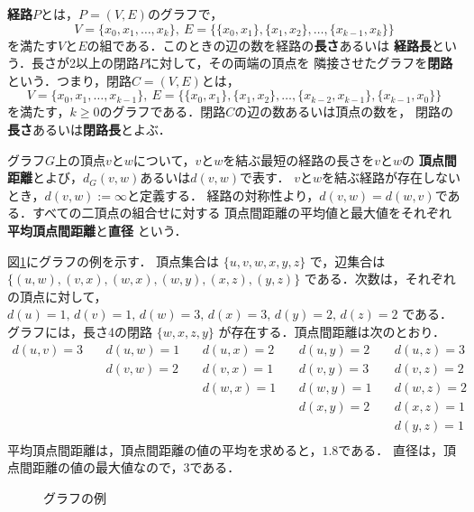 \textbf{経路}$P$とは，$P=(V,E)$のグラフで，
\[ V=\{x_0,x_1,\ldots,x_k\},\:
E=\{\{x_0,x_1\},\{x_1,x_2\},\ldots,\{x_{k-1},x_k\}\}\]
を満たす$V$と$E$の組である．このときの辺の数を経路の\textbf{長さ}あるいは
\textbf{経路長}という．長さが2以上の閉路$P$に対して，その両端の頂点を
隣接させたグラフを\textbf{閉路}という．つまり，閉路$C=(V,E)$とは，
\[ V=\{x_0,x_1,\ldots,x_{k-1}\},\:
E=\{\{x_0,x_1\},\{x_1,x_2\},\ldots,\{x_{k-2},x_{k-1}\},\{x_{k-1},x_0\}\}\]
を満たす，$k\geq0$のグラフである．閉路$C$の辺の数あるいは頂点の数を，
閉路の\textbf{長さ}あるいは\textbf{閉路長}とよぶ．

グラフ$G$上の頂点$v$と$w$について，$v$と$w$を結ぶ最短の経路の長さを$v$と$w$の
\textbf{頂点間距離}とよび，$d_G(v,w)$あるいは$d(v,w)$で表す．
$v$と$w$を結ぶ経路が存在しないとき，$d(v,w):=\infty$と定義する．
経路の対称性より，$d(v,w)=d(w,v)$である．すべての二頂点の組合せに対する
頂点間距離の平均値と最大値をそれぞれ\textbf{平均頂点間距離}と\textbf{直径}
という．

\begin{example}
  図\ref{fig:graph-example}にグラフの例を示す．
  頂点集合は
  $\{u,v,w,x,y,z\}$
  で，辺集合は
  $\{(u,w),(v,x),(w,x),(w,y),(x,z),(y,z)\}$
  である．次数は，それぞれの頂点に対して，
  $d(u)=1,\,d(v)=1,\,d(w)=3,\,d(x)=3,\,d(y)=2,\,d(z)=2$
  である．グラフには，長さ4の閉路
  $\{w,x,z,y\}$
  が存在する．頂点間距離は次のとおり．
  \begin{equation*}
    \begin{aligned}
      d(u,v)=3&\:&d(u,w)=1&\:&d(u,x)=2&\:&d(u,y)=2&\:&d(u,z)=3 \\
      &\:&d(v,w)=2&\:&d(v,x)=1&\:&d(v,y)=3&\:&d(v,z)=2 \\
      &\:&&\:&d(w,x)=1&\:&d(w,y)=1&\:&d(w,z)=2 \\
      &\:&&\:&&\:&d(x,y)=2&\:&d(x,z)=1 \\
      &\:&&\:&&\:&&\:&d(y,z)=1 \\
    \end{aligned}
  \end{equation*}
  平均頂点間距離は，頂点間距離の値の平均を求めると，$1.8$である．
  直径は，頂点間距離の値の最大値なので，$3$である．
  \begin{figure}
    \centering
    
    \caption{グラフの例}
    \label{fig:graph-example}
  \end{figure}
\end{example}


